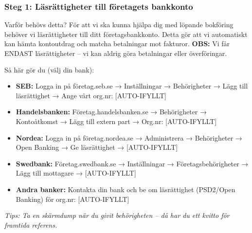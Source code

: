 \documentclass[10pt]{beamer}
\begin{document}
\begin{frame}[fragile,label=bankrattigheter]
  \frametitle{Steg 1: Läsrättigheter till företagets bankkonto}

  \begin{block}{Varför behövs detta?}
    \vspace{0.2cm}
    För att vi ska kunna hjälpa dig med löpande bokföring behöver vi läsrättigheter till ditt företagsbankkonto.
    Detta gör att vi automatiskt kan hämta kontoutdrag och matcha betalningar mot fakturor.
    \vspace{0.2cm}
    \textbf{OBS:} Vi får ENDAST läsrättigheter – vi kan aldrig göra betalningar eller överföringar.
  \end{block}

  \vspace{0.4cm}

  \begin{block}{Så här gör du (välj din bank):}
    \footnotesize
    \begin{itemize}
      \item \textbf{SEB:} Logga in på företag.seb.se → Inställningar → Behörigheter → Lägg till läsrättighet → Ange vårt org.nr: [AUTO-IFYLLT]
      \item \textbf{Handelsbanken:} Företag.handelsbanken.se → Behörigheter → Kontoåtkomst → Lägg till extern part → Org.nr: [AUTO-IFYLLT]
      \item \textbf{Nordea:} Logga in på företag.nordea.se → Administrera → Behörigheter → Open Banking → Ge läsrättighet → [AUTO-IFYLLT]
      \item \textbf{Swedbank:} Företag.swedbank.se → Inställningar → Företagsbehörigheter → Lägg till mottagare → [AUTO-IFYLLT]
      \item \textbf{Andra banker:} Kontakta din bank och be om läsrättighet (PSD2/Open Banking) för org.nr: [AUTO-IFYLLT]
    \end{itemize}
  \end{block}

  \vspace{0.4cm}
  \begin{center}
  \end{center}

  \vspace{0.3cm}
  \footnotesize
  \textit{Tips: Ta en skärmdump när du givit behörigheten – då har du ett kvitto för framtida referens.}

\end{frame}
\end{document}
